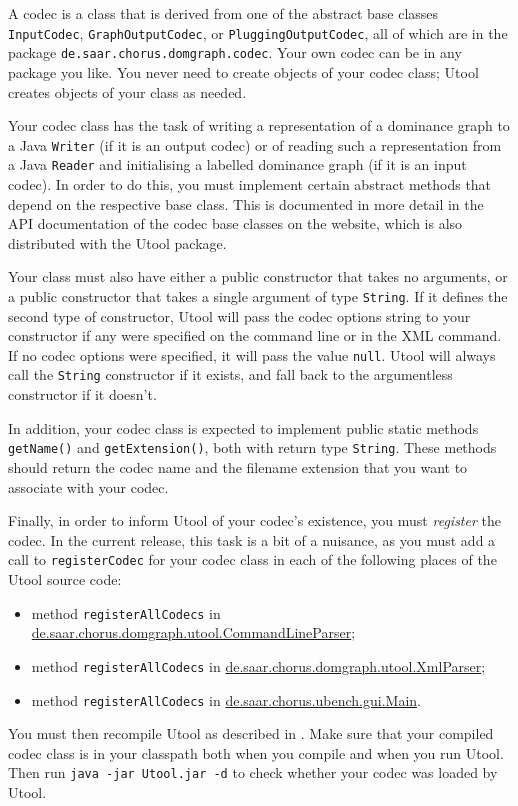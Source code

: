 A codec is a class that is derived from one of the abstract base
classes \verb?InputCodec?, \verb?GraphOutputCodec?, or
\verb?PluggingOutputCodec?, all of which are in the package
\verb?de.saar.chorus.domgraph.codec?. Your own codec can be in any
package you like. You never need to create objects of your codec
class; Utool creates objects of your class as needed.

Your codec class has the task of writing a representation of a
dominance graph to a Java \verb?Writer? (if it is an output codec) or
of reading such a representation from a Java \verb?Reader? and
initialising a labelled dominance graph (if it is an input codec). In
order to do this, you must implement certain abstract methods that
depend on the respective base class. This is documented in more detail
in the API documentation of the codec base classes on the website,
which is also distributed with the Utool package.

Your class must also have either a public constructor that takes no
arguments, or a public constructor that takes a single argument of
type \verb?String?. If it defines the second type of constructor,
Utool will pass the codec options string to your constructor if any
were specified on the command line or in the XML command. If no codec
options were specified, it will pass the value \verb?null?. Utool will
always call the \verb?String? constructor if it exists, and fall back
to the argumentless constructor if it doesn't.

In addition, your codec class is expected to implement public static
methods \verb?getName()? and \verb?getExtension()?, both with return
type \verb?String?. These methods should return the codec name and the
filename extension that you want to associate with your codec.

Finally, in order to inform Utool of your codec's existence, you must
\emph{register} the codec. In the current release, this task is a bit
of a nuisance, as you must add a call to \verb?registerCodec? for your
codec class in each of the following places of the Utool source code:
\begin{itemize}
\item method \verb?registerAllCodecs? in
  \url{de.saar.chorus.domgraph.utool.CommandLineParser};
\item method \verb?registerAllCodecs? in
  \url{de.saar.chorus.domgraph.utool.XmlParser};
\item method \verb?registerAllCodecs? in
  \url{de.saar.chorus.ubench.gui.Main}. 
\end{itemize}

You must then recompile Utool as described in . Make sure
that your compiled codec class is in your classpath both when you
compile and when you run Utool. Then run \verb?java -jar Utool.jar -d?
to check whether your codec was loaded by Utool.








